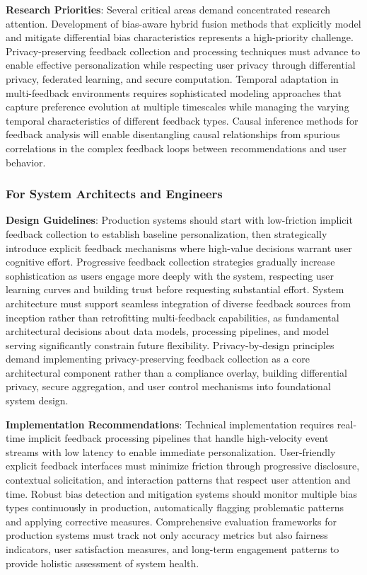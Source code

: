 \textbf{Research Priorities}: Several critical areas demand concentrated research attention. Development of bias-aware hybrid fusion methods that explicitly model and mitigate differential bias characteristics represents a high-priority challenge. Privacy-preserving feedback collection and processing techniques must advance to enable effective personalization while respecting user privacy through differential privacy, federated learning, and secure computation. Temporal adaptation in multi-feedback environments requires sophisticated modeling approaches that capture preference evolution at multiple timescales while managing the varying temporal characteristics of different feedback types. Causal inference methods for feedback analysis will enable disentangling causal relationships from spurious correlations in the complex feedback loops between recommendations and user behavior.

\subsubsection{For System Architects and Engineers}

\textbf{Design Guidelines}: Production systems should start with low-friction implicit feedback collection to establish baseline personalization, then strategically introduce explicit feedback mechanisms where high-value decisions warrant user cognitive effort. Progressive feedback collection strategies gradually increase sophistication as users engage more deeply with the system, respecting user learning curves and building trust before requesting substantial effort. System architecture must support seamless integration of diverse feedback sources from inception rather than retrofitting multi-feedback capabilities, as fundamental architectural decisions about data models, processing pipelines, and model serving significantly constrain future flexibility. Privacy-by-design principles demand implementing privacy-preserving feedback collection as a core architectural component rather than a compliance overlay, building differential privacy, secure aggregation, and user control mechanisms into foundational system design.

\textbf{Implementation Recommendations}: Technical implementation requires real-time implicit feedback processing pipelines that handle high-velocity event streams with low latency to enable immediate personalization. User-friendly explicit feedback interfaces must minimize friction through progressive disclosure, contextual solicitation, and interaction patterns that respect user attention and time. Robust bias detection and mitigation systems should monitor multiple bias types continuously in production, automatically flagging problematic patterns and applying corrective measures. Comprehensive evaluation frameworks for production systems must track not only accuracy metrics but also fairness indicators, user satisfaction measures, and long-term engagement patterns to provide holistic assessment of system health.


